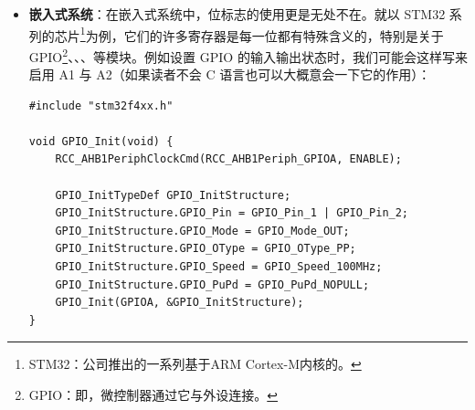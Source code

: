 \begin{itemize}
          这里 U、G、O 分别表示文件所有者(User)、文件所在组(Group)、其他用户(Other)。同样的，设置权限时也是设置这些位。例如如果我们想给文件 \texttt{example} 所有者设置读写权限，同时对组和其他用户设置读权限，我们可以使用 \texttt{chmod} 命令：
          \begin{verbatim}
chmod u=rw,g=r,o=r example
    \end{verbatim}

          可是这仍然有些麻烦，有没有更简洁紧凑的写法呢？答案是有的，我们可以使用八进制数来表示这些权限。我们把每 3 位看成一个八进制数，分别表示 User、Group、Other 的权限。例如 7 在 2 进制中是 111，表示所有权限都开启，而 5 是 101，表示读和执行权限开启。\texttt{rw} 的二进制表示就是 110，对应的八进制数就是 6。而 \texttt{r} 的二进制表示就是 100，对应的八进制数就是 4。因此上面的代码就可以简化为
          \begin{verbatim}
chmod 644 example
    \end{verbatim}

          通过这个例子我们已经可以看到了位标志是如何简化操作的，不过让我们再继续看一些例子来更好地理解位标志的应用。

    \item \textbf{嵌入式系统}：在嵌入式系统中，位标志的使用更是无处不在。就以 STM32 系列的芯片\footnote{STM32：公司推出的一系列基于ARM Cortex-M内核的。}为例，它们的许多寄存器是每一位都有特殊含义的，特别是关于 GPIO\footnote{GPIO：即，微控制器通过它与外设连接。}、、、等模块。例如设置 GPIO 的输入输出状态时，我们可能会这样写来启用 A1 与 A2（如果读者不会 C 语言也可以大概意会一下它的作用）：
          \begin{verbatim}
#include "stm32f4xx.h"

void GPIO_Init(void) {
    RCC_AHB1PeriphClockCmd(RCC_AHB1Periph_GPIOA, ENABLE);

    GPIO_InitTypeDef GPIO_InitStructure;
    GPIO_InitStructure.GPIO_Pin = GPIO_Pin_1 | GPIO_Pin_2;
    GPIO_InitStructure.GPIO_Mode = GPIO_Mode_OUT;
    GPIO_InitStructure.GPIO_OType = GPIO_OType_PP;
    GPIO_InitStructure.GPIO_Speed = GPIO_Speed_100MHz;
    GPIO_InitStructure.GPIO_PuPd = GPIO_PuPd_NOPULL;
    GPIO_Init(GPIOA, &GPIO_InitStructure);
}
    \end{verbatim}


\end{itemize}
